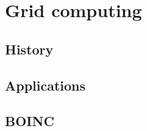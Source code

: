 
\chapter{Grid computing}
\label{grid_computing}




\section{History}


\section{Applications}


\section{BOINC}
